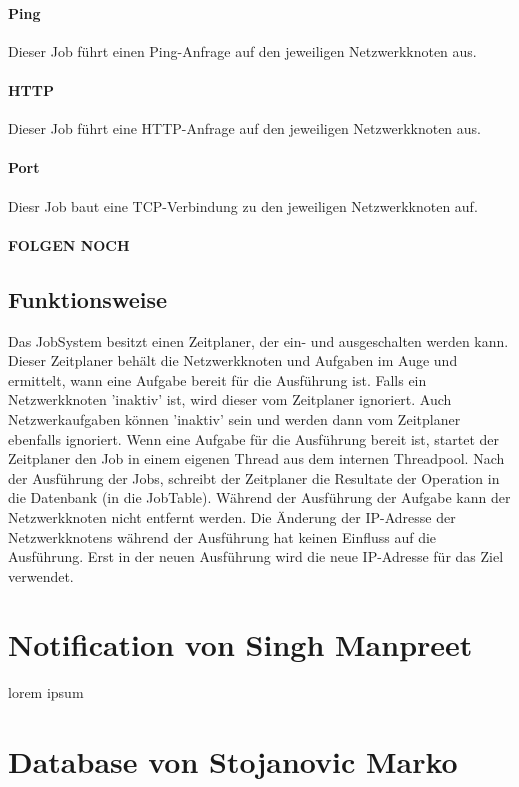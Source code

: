 \documentclass[12pt,a4paper]{report}
\begin{document}
\subsubsection{Ping} Dieser Job führt einen Ping-Anfrage auf den jeweiligen Netzwerkknoten aus.

\subsubsection{HTTP} Dieser Job führt eine HTTP-Anfrage auf den jeweiligen Netzwerkknoten aus.

\subsubsection{Port} Diesr Job baut eine TCP-Verbindung zu den jeweiligen Netzwerkknoten auf.

\subsubsection{FOLGEN NOCH}

\section{Funktionsweise}

Das JobSystem besitzt einen Zeitplaner, der ein- und ausgeschalten werden kann. Dieser Zeitplaner behält die Netzwerkknoten und Aufgaben im Auge und ermittelt, wann eine Aufgabe bereit für die Ausführung ist. Falls ein Netzwerkknoten 'inaktiv' ist, wird dieser vom Zeitplaner ignoriert. Auch Netzwerkaufgaben können 'inaktiv' sein und werden dann vom Zeitplaner ebenfalls ignoriert. Wenn eine Aufgabe für die Ausführung bereit ist, startet der Zeitplaner den Job in einem eigenen Thread aus dem internen Threadpool. Nach der Ausführung der Jobs, schreibt der Zeitplaner die Resultate der Operation in die Datenbank (in die JobTable). Während der Ausführung der Aufgabe kann der Netzwerkknoten nicht entfernt werden. Die Änderung der IP-Adresse der Netzwerkknotens während der Ausführung hat keinen Einfluss auf die Ausführung. Erst in der neuen Ausführung wird die neue IP-Adresse für das Ziel verwendet.

\chapter{Notification von Singh Manpreet}
lorem ipsum

\chapter{Database von Stojanovic Marko}
\end{document}
